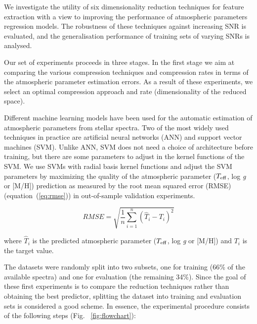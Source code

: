 \documentclass[a4paper,fleqn,usenatbib]{mnras}
\begin{document}
{{{We investigate the utility of six dimensionality reduction techniques
for feature extraction with a view to improving the performance of
atmospheric parameters regression models. The robustness of these
techniques against increasing SNR is evaluated, and the generalisation
performance of training sets of varying SNRs is analysed.

Our set of experiments proceeds in three stages. In the first stage we
aim at comparing the various compression techniques and compression
rates in terms of the atmospheric parameter estimation errors. As a
result of these experiments, we select an optimal compression approach
and rate (dimensionality of the reduced space).

Different machine learning models have been used for the automatic
estimation of atmospheric parameters from stellar spectra. Two of the
most widely used techniques in practice are artificial neural networks
(ANN) and support vector machines (SVM). Unlike ANN, SVM does not need
a choice of architecture before training, but there are some
parameters to adjust in the kernel functions of the SVM. We use SVMs
with radial basis kernel functions and adjust the SVM parameters by
maximizing the quality of the atmospheric parameter ($T_{\rm eff}$,
log \textit{g} or [M/H]) prediction as measured by the root mean
squared error (RMSE) (equation~(\ref{eq:rmse})) in out-of-sample
validation experiments.

\begin{equation}
\label{eq:rmse}
RMSE=\sqrt{\frac{1}{n}\sum_{i=1}^{n}\left(\hat{T}_{i}-T_{i}\right)^{2}}
\end{equation}

where $\hat{T}_{i}$ is the predicted atmospheric parameter ($T_{\rm eff}$, 
  log \textit{g} or [M/H]) and $T_{i}$ is the target value. 
  
The datasets were randomly split into two subsets, one for training
(66\% of the available spectra) and one for evaluation (the remaining
34\%). Since the goal of these first experiments is to compare the
reduction techniques rather than obtaining the best predictor,
splitting the dataset into training and evaluation sets is considered
a good scheme. In essence, the experimental procedure consists of the
following steps (Fig.~ \ref{fig:flowchart}):

}}}
\end{document}
